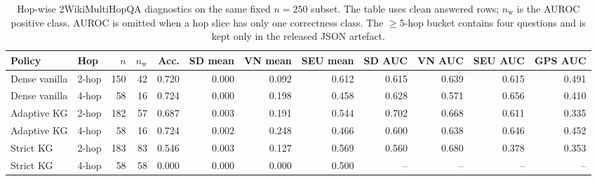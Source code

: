 \begin{table}[t]
\centering
\small
\caption{%
  Hop-wise 2WikiMultiHopQA diagnostics on the same fixed $n=250$ subset.
  The table uses clean answered rows; $n_{\mathrm{w}}$ is the AUROC positive
  class.
  AUROC is omitted when a hop slice has only one correctness class.
  The $\geq$5-hop bucket contains four questions and is kept only in the
  released JSON artefact.%
}
\label{tab:twowiki_hopwise_diagnostics}
\setlength{\tabcolsep}{3.4pt}
\begin{tabular}{@{}llrrrrrrrrrr@{}}
\toprule
Policy & Hop & $n$ & $n_{\mathrm{w}}$ & Acc. & SD mean & VN mean & SEU mean &
SD AUC & VN AUC & SEU AUC & GPS AUC \\
\midrule
Dense vanilla & 2-hop & 150 & 42 & 0.720 & 0.000 & 0.092 & 0.612 & 0.615 & 0.639 & 0.615 & 0.491 \\
Dense vanilla & 4-hop & 58 & 16 & 0.724 & 0.000 & 0.198 & 0.458 & 0.628 & 0.571 & 0.656 & 0.410 \\
Adaptive KG & 2-hop & 182 & 57 & 0.687 & 0.003 & 0.191 & 0.544 & 0.702 & 0.668 & 0.611 & 0.335 \\
Adaptive KG & 4-hop & 58 & 16 & 0.724 & 0.002 & 0.248 & 0.466 & 0.600 & 0.638 & 0.646 & 0.452 \\
Strict KG & 2-hop & 183 & 83 & 0.546 & 0.003 & 0.127 & 0.569 & 0.560 & 0.680 & 0.378 & 0.353 \\
Strict KG & 4-hop & 58 & 58 & 0.000 & 0.000 & 0.000 & 0.500 & -- & -- & -- & -- \\
\bottomrule
\end{tabular}
\end{table}
